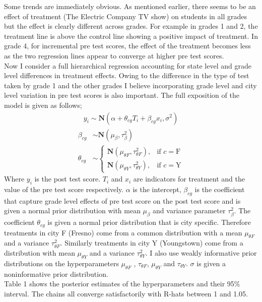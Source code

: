 \documentclass{article}
\begin{document}
Some trends are immediately obvious. As mentioned earlier, there seems to be an effect of treatment (The Electric Company TV show) on students in all grades but the effect is clearly different across grades. For example in grades 1 and 2, the treatment line is above the control line showing a positive impact of treatment. In grade 4, for incremental pre test scores, the effect of the treatment becomes less as the two regression lines appear to converge at higher pre test scores.\\
Now I consider a full hierarchical regression accounting for state level and grade level differences in treatment effects. Owing to the difference in the type of test taken by grade 1 and the other grades I believe incorporating grade level and city level variation in pre test scores is also important. The full exposition of the model is given as follows;
\begin{align*}
y_i \sim \textbf{N}(\alpha + \theta_{cg} T_i + \beta_{cg} x_i, \sigma^2)
\end{align*}
\begin{align*}
\beta_{cg} &\sim \textbf{N}(\mu_\beta, \tau_{\beta}^2)\\
\theta_{cg} &\sim
\begin{cases}
   \textbf{N}(\mu_{\theta F}, \tau_{\theta F}^2) ,& \text{if } c = \text{F}\\
     \textbf{N}(\mu_{\theta Y}, \tau_{\theta Y}^2) ,& \text{if } c = \text{Y}
\end{cases}
\end{align*}
Where $y_i$ is the post test score. $T_i$ and $x_i$ are indicators for treatment and the value of the pre test score respectively. $\alpha$ is the intercept, $\beta_{cg}$ is the coefficient that capture grade level effects of pre test score on the post test score and is given a normal prior distribution with mean $\mu_\beta$ and variance parameter $\tau_\beta^2$. The coefficient $\theta_{cg}$ is given a normal prior distribution that is city specific. Therefore treatments in city F (Fresno) come from a common distribution with a mean $\mu_{\theta F}$ and a variance $\tau_{\theta F}^2$. Similarly treatments in city Y (Youngstown) come from a distribution with mean $\mu_{\theta Y}$ and a variance $\tau_{\theta Y}^2$. I also use weakly informative prior distributions on the hyperparameters $\mu_{\theta F}$ , $\tau_{\theta F}$, $\mu_{\theta Y}$ and $\tau_{\theta Y}$. $\sigma$ is given a noninformative prior distribution.\\
Table 1 shows the posterior estimates of the hyperparameters and their 95\% interval. The chains all converge satisfactorily with R-hats between 1 and 1.05.
\end{document}
